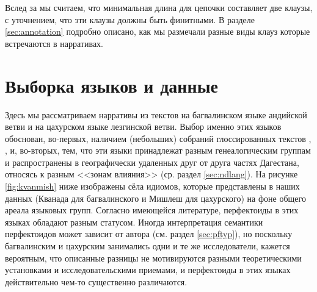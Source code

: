 
Вслед за \citep{paducheva2010} мы считаем, что минимальная длина для цепочки составляет две клаузы, с уточнением, что эти клаузы должны быть финитными. В разделе \ref{sec:annotation} подробно описано, как мы размечали разные виды клауз которые встречаются в нарративах.

\vfill
\pagebreak

\section{Выборка языков и данные} \label{sec:sample}

Здесь мы рассматриваем нарративы из текстов на багвалинском языке андийской ветви и на цахурском языке лезгинской ветви. Выбор именно этих языков обоснован, во-первых, наличием (небольших) собраний глоссированных текстов \citep{tsakhurgram}, \citep{bagvalalgram}, и, во-вторых, тем, что эти языки принадлежат разным генеалогическим группам и распространены в географически удаленных друг от друга частях Дагестана, относясь к разным <<зонам влияния>> (ср. раздел \ref{sec:ndlang}). На рисунке \ref{fig:kvanmish} ниже изображены сёла идиомов, которые представлены в наших данных (Кванада для багвалинского и Мишлеш для цахурского) на фоне общего ареала языковых групп. Согласно имеющейся литературе, перфектоиды в этих языках обладают разным статусом. Иногда интерпретация семантики перфектоидов может зависит от автора (см. раздел \ref{sec:pftyp}), но поскольку багвалинским и цахурским занимались одни и те же исследователи, кажется вероятным, что описанные разницы не мотивируются разными теоретическими установками и исследовательскими приемами, и перфектоиды в этих языках действительно чем-то существенно различаются.

